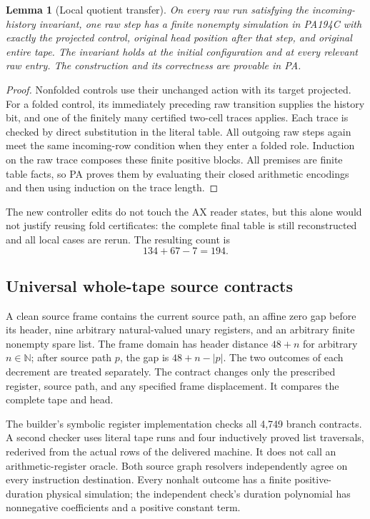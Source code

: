 \documentclass[11pt]{article}
\newtheorem{lemma}[theorem]{Lemma}
\theoremstyle{definition}
\theoremstyle{remark}
\begin{document}
\begin{lemma}[Local quotient transfer]
On every raw run satisfying the incoming-history invariant, one raw step
has a finite nonempty simulation in PA194C with exactly the projected
control, original head position after that step, and original entire tape.
The invariant holds at the initial configuration and at every relevant
raw entry. The construction and its correctness are provable in PA.
\end{lemma}
\begin{proof}
Nonfolded controls use their unchanged action with its target projected.
For a folded control, its immediately preceding raw transition supplies
the history bit, and one of the finitely many certified two-cell traces
applies. Each trace is checked by direct substitution in the literal
table. All outgoing raw steps again meet the same incoming-row condition
when they enter a folded role. Induction on the raw trace composes these
finite positive blocks. All premises are finite table facts, so PA proves
them by evaluating their closed arithmetic encodings and then using
induction on the trace length.
\end{proof}

The new controller edits do not touch the AX reader states, but this alone
would not justify reusing fold certificates: the complete final table is
still reconstructed and all local cases are rerun. The resulting count is
\[
 \boxed{134+67-7=194.}
\]

\subsection{Universal whole-tape source contracts}

A clean source frame contains the current source path, an affine zero gap
before its header, nine arbitrary natural-valued unary registers, and an
arbitrary finite nonempty spare list. The frame domain has header distance
$48+n$ for arbitrary $n\in\mathbb N$; after source path $p$, the gap is
$48+n-|p|$. The two outcomes of each decrement are treated separately.
The contract changes only the prescribed register, source path, and any
specified frame displacement. It compares the complete tape and head.

The builder's symbolic register implementation checks all 4,749 branch
contracts. A second checker uses literal tape runs and four inductively
proved list traversals, rederived from the actual rows of the delivered
machine. It does not call an arithmetic-register oracle. Both source graph
resolvers independently agree on every instruction destination. Every
nonhalt outcome has a finite positive-duration physical simulation; the
independent check's duration polynomial has nonnegative coefficients and
a positive constant term.
\end{document}
